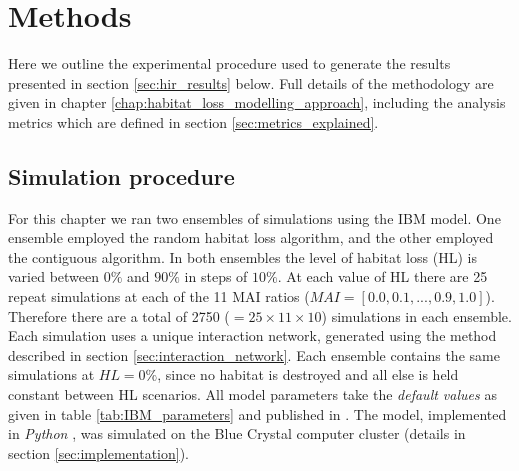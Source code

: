 





\section{Methods}
\label{sec:methods_hi}

Here we outline the experimental procedure used to generate the results presented in section \ref{sec:hir_results} below. Full details of the methodology are given in chapter \ref{chap:habitat_loss_modelling_approach}, including the analysis metrics which are defined in section \ref{sec:metrics_explained}. 

\subsection{Simulation procedure}
\label{sec:simulation_procedure}

For this chapter we ran two ensembles of simulations using the IBM model. One ensemble employed the random habitat loss algorithm, and the other employed the contiguous algorithm. In both ensembles the level of habitat loss (HL) is varied between $0\%$ and $90\%$ in steps of $10\%$. At each value of HL there are 25 repeat simulations at each of the 11 MAI ratios ($MAI=[0.0,0.1,...,0.9,1.0]$). Therefore there are a total of 2750 ($=25 \times 11 \times 10$) simulations in each ensemble. Each simulation uses a unique interaction network, generated using the method described in section \ref{sec:interaction_network}. Each ensemble contains the same simulations at $HL=0\%$, since no habitat is destroyed and all else is held constant between HL scenarios. All model parameters take the \emph{default values} as given in table \ref{tab:IBM_parameters} and published in \cite{lurgi2015effects}. The model, implemented in \emph{Python} \cite{python}, was simulated on the Blue Crystal computer cluster \cite{BC3} (details in section \ref{sec:implementation}).


